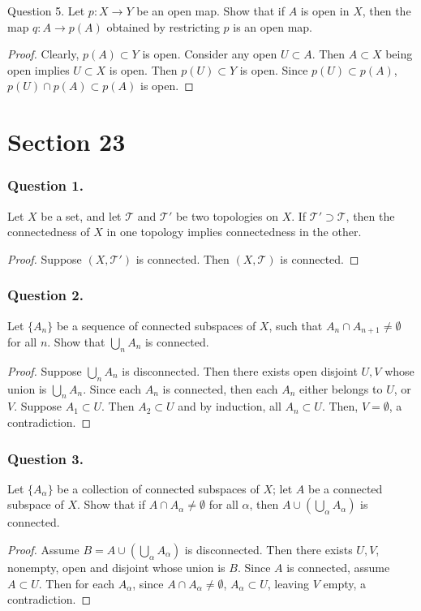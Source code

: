 \documentclass[12pt]{article}
\begin{document}
    
Question 5. Let \( p: X \to Y \) be an open map. 
Show that if \( A \) is open in \( X \), then the map \( q: A \to p(A) \) obtained by restricting \( p \) is an open map.
\begin{proof}
    Clearly, $p(A) \subset Y$ is open. Consider any open $U \subset A$.
    Then $A \subset X$ being open implies $U \subset X$ is open.
    Then $p(U) \subset Y$ is open. Since $p(U) \subset p(A)$, $p(U) \cap p(A) \subset p(A)$
    is open.
\end{proof}
\section{Section 23}
\subsubsection*{Question 1.} Let \( X \) be a set, and let \( \mathcal{T} \) and \( \mathcal{T}' \) be two 
topologies on \( X \). If \( \mathcal{T}' \supset \mathcal{T} \), then the connectedness of \( X \) in one topology implies connectedness in the other.

\begin{proof}
    Suppose $(X, \mathcal{T'})$ is connected. Then $(X, \mathcal{T})$ is connected.
\end{proof}
\subsubsection*{Question 2.} Let \( \{ A_n \} \) be a sequence of connected subspaces 
of \( X \), such that \( A_n \cap A_{n+1} \neq \emptyset \) for all \( n \). Show that \( \bigcup_{n} A_n \) is connected.
\begin{proof}
    Suppose $\bigcup_n A_n$ is disconnected. Then there exists open disjoint 
    $U, V$ whose union is $\bigcup_n A_n$. Since each $A_n$ is connected, then
    each $A_n$ either belongs to $U$, or $V$. Suppose $A_1 \subset U$. Then $A_2 \subset U$
    and by induction, all $A_n \subset U$. Then, $V = \emptyset$, a contradiction.  
\end{proof}
\subsubsection*{Question 3.} Let \( \{ A_{\alpha} \} \) be a collection of connected 
subspaces of \( X \); let \( A \) be a connected subspace of \( X \). Show that if \( A \cap A_{\alpha} \neq \emptyset \) for all \( \alpha \), then \( A \cup \left( \bigcup_{\alpha} A_{\alpha} \right) \) is connected.
\begin{proof}
    Assume $B = A \cup (\bigcup_\alpha A_\alpha)$ is disconnected.
    Then there exists $U, V$, nonempty, open and disjoint whose union is $B$.
    Since $A$ is connected, assume $A \subset U$. Then for each $A_\alpha$, since $A 
    \cap A_\alpha \ne \emptyset$, $A_\alpha \subset U$, leaving $V$ empty, a contradiction.
\end{proof}
\end{document}
